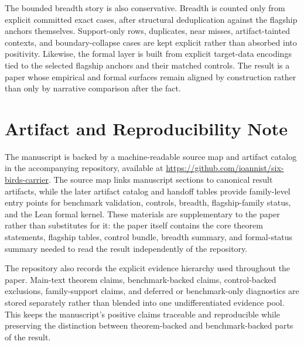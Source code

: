 \documentclass[11pt]{article}
\theoremstyle{definition}
\begin{document}
The bounded breadth story is also conservative. Breadth is counted only from explicit committed exact cases, after structural deduplication against the flagship anchors themselves. Support-only rows, duplicates, near misses, artifact-tainted contexts, and boundary-collapse cases are kept explicit rather than absorbed into positivity. Likewise, the formal layer is built from explicit target-data encodings tied to the selected flagship anchors and their matched controls. The result is a paper whose empirical and formal surfaces remain aligned by construction rather than only by narrative comparison after the fact.
 \section{Artifact and Reproducibility Note}

The manuscript is backed by a machine-readable source map and artifact catalog in the accompanying repository, available at \url{https://github.com/ioannist/six-birds-carrier}. The source map links manuscript sections to canonical result artifacts, while the later artifact catalog and handoff tables provide family-level entry points for benchmark validation, controls, breadth, flagship-family status, and the Lean formal kernel. These materials are supplementary to the paper rather than substitutes for it: the paper itself contains the core theorem statements, flagship tables, control bundle, breadth summary, and formal-status summary needed to read the result independently of the repository.

The repository also records the explicit evidence hierarchy used throughout the paper. Main-text theorem claims, benchmark-backed claims, control-backed exclusions, family-support claims, and deferred or benchmark-only diagnostics are stored separately rather than blended into one undifferentiated evidence pool. This keeps the manuscript's positive claims traceable and reproducible while preserving the distinction between theorem-backed and benchmark-backed parts of the result.
 


\end{document}
